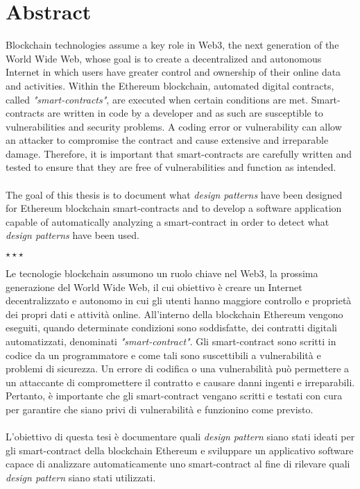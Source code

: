 \chapter*{Abstract}\label{abstract}
Blockchain technologies assume a key role in Web3, the next generation of the World Wide Web, whose goal is to create a decentralized and autonomous Internet in which users have greater control and ownership of their online data and activities. Within the Ethereum blockchain, automated digital contracts, called \textit{"smart-contracts"}, are executed when certain conditions are met. Smart-contracts are written in code by a developer and as such are susceptible to vulnerabilities and security problems. A coding error or vulnerability can allow an attacker to compromise the contract and cause extensive and irreparable damage. Therefore, it is important that smart-contracts are carefully written and tested to ensure that they are free of vulnerabilities and function as intended.\\
\\
The goal of this thesis is to document what \textit{design patterns} have been designed for Ethereum blockchain smart-contracts and to develop a software application capable of automatically analyzing a smart-contract in order to detect what \textit{design patterns} have been used.
\vspace{15pt}
\begin{center}
\large$\star\star\star$
\end{center}
\vspace{15pt}
Le tecnologie blockchain assumono un ruolo chiave nel Web3, la prossima generazione del World Wide Web, il cui obiettivo è creare un Internet decentralizzato e autonomo in cui gli utenti hanno maggiore controllo e proprietà dei propri dati e attività online. All'interno della blockchain Ethereum vengono eseguiti, quando determinate condizioni sono soddisfatte, dei contratti digitali automatizzati, denominati \textit{"smart-contract"}. Gli smart-contract sono scritti in codice da un programmatore e come tali sono suscettibili a vulnerabilità e problemi di sicurezza. Un errore di codifica o una vulnerabilità può permettere a un attaccante di compromettere il contratto e causare danni ingenti e irreparabili. Pertanto, è importante che gli smart-contract vengano scritti e testati con cura per garantire che siano privi di vulnerabilità e funzionino come previsto.\\
\\
L'obiettivo di questa tesi è documentare quali \textit{design pattern} siano stati ideati per gli smart-contract della blockchain Ethereum e sviluppare un applicativo software capace di analizzare automaticamente uno smart-contract al fine di rilevare quali \textit{design pattern} siano stati utilizzati.
 
